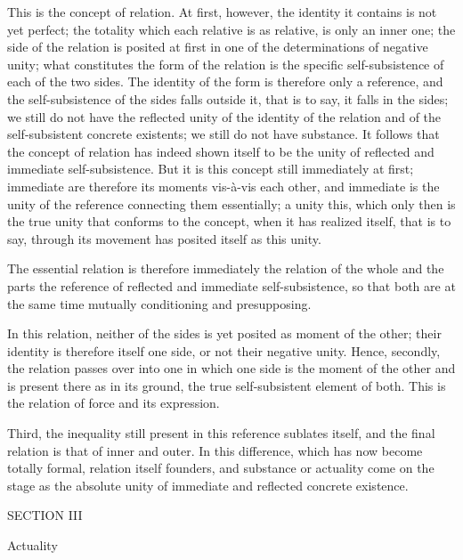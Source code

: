 This is the concept of relation.
At first, however, the identity it contains is not yet perfect;
the totality which each relative is as relative, is only an inner one;
the side of the relation is posited at first
in one of the determinations of negative unity;
what constitutes the form of the relation is
the specific self-subsistence of each of the two sides.
The identity of the form is therefore only a reference,
and the self-subsistence of the sides falls outside it,
that is to say, it falls in the sides;
we still do not have the reflected unity
of the identity of the relation
and of the self-subsistent concrete existents;
we still do not have substance.
It follows that the concept of relation has
indeed shown itself to be the unity
of reflected and immediate self-subsistence.
But it is this concept still immediately at first;
immediate are therefore its moments vis-à-vis each other,
and immediate is the unity of the reference
connecting them essentially;
a unity this, which only then is the true unity
that conforms to the concept,
when it has realized itself, that is to say,
through its movement has posited itself as this unity.

The essential relation is therefore immediately
the relation of the whole and the parts
the reference of reflected and immediate self-subsistence,
so that both are at the same time
mutually conditioning and presupposing.

In this relation, neither of the sides is
yet posited as moment of the other;
their identity is therefore itself one side,
or not their negative unity.
Hence, secondly, the relation passes over into one
in which one side is the moment of the other
and is present there as in its ground,
the true self-subsistent element of both.
This is the relation of force and its expression.

Third, the inequality still present
in this reference sublates itself,
and the final relation is that of inner and outer.
In this difference, which has now become totally formal,
relation itself founders, and substance or actuality
come on the stage as the absolute unity of
immediate and reflected concrete existence.

SECTION III

Actuality

